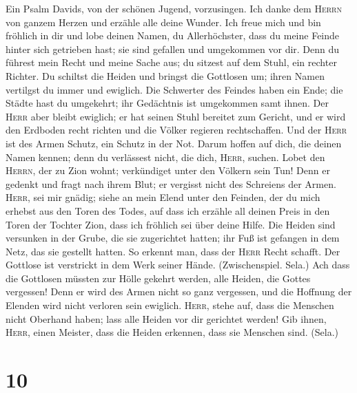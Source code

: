  Ein Psalm Davids, von der schönen Jugend, vorzusingen.
 Ich danke dem \textsc{Herrn} von ganzem Herzen und
erzähle alle deine Wunder.  Ich freue mich und bin
fröhlich in dir und lobe deinen Namen, du Allerhöchster, 
dass du meine Feinde hinter sich getrieben hast; sie sind gefallen und
umgekommen vor dir.  Denn du führest mein Recht und meine
Sache aus; du sitzest auf dem Stuhl, ein rechter Richter. 
Du schiltst die Heiden und bringst die Gottlosen um; ihren Namen
vertilgst du immer und ewiglich.  Die Schwerter des
Feindes haben ein Ende; die Städte hast du umgekehrt; ihr Gedächtnis ist
umgekommen samt ihnen.  Der \textsc{Herr} aber bleibt
ewiglich; er hat seinen Stuhl bereitet zum Gericht,  und
er wird den Erdboden recht richten und die Völker regieren
rechtschaffen.  Und der \textsc{Herr} ist des Armen
Schutz, ein Schutz in der Not.  Darum hoffen auf dich,
die deinen Namen kennen; denn du verlässest nicht, die dich,
\textsc{Herr}, suchen.  Lobet den \textsc{Herrn}, der zu
Zion wohnt; verkündiget unter den Völkern sein Tun!  Denn
er gedenkt und fragt nach ihrem Blut; er vergisst nicht des Schreiens
der Armen.  \textsc{Herr}, sei mir gnädig; siehe an mein
Elend unter den Feinden, der du mich erhebst aus den Toren des Todes,
 auf dass ich erzähle all deinen Preis in den Toren der
Tochter Zion, dass ich fröhlich sei über deine Hilfe. 
Die Heiden sind versunken in der Grube, die sie zugerichtet hatten; ihr
Fuß ist gefangen in dem Netz, das sie gestellt hatten. 
So erkennt man, dass der \textsc{Herr} Recht schafft. Der Gottlose ist
verstrickt in dem Werk seiner Hände. (Zwischenspiel. Sela.)
 Ach dass die Gottlosen müssten zur Hölle gekehrt werden,
alle Heiden, die Gottes vergessen!  Denn er wird des
Armen nicht so ganz vergessen, und die Hoffnung der Elenden wird nicht
verloren sein ewiglich.  \textsc{Herr}, stehe auf, dass
die Menschen nicht Oberhand haben; lass alle Heiden vor dir gerichtet
werden!  Gib ihnen, \textsc{Herr}, einen Meister, dass
die Heiden erkennen, dass sie Menschen sind. (Sela.)

\hypertarget{section-9}{%
\section{10}\label{section-9}}

